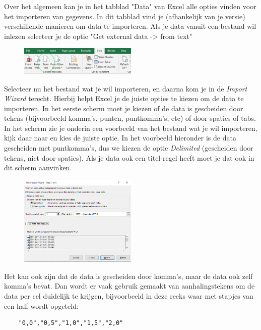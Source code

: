Over het algemeen kan je in het tabblad "Data" van Excel alle opties vinden voor het importeren van gegevens. In dit tabblad vind je (afhankelijk van je versie) verschillende manieren om data te importeren. Als je data vanuit een bestand wil inlezen selecteer je de optie "Get external data -> from text"

\begin{figure}[h]
\begin{center}
\includegraphics[width=0.5\textwidth]{img/Excelimport.png}
\end{center}
\end{figure}

Selecteer nu het bestand wat je wil importeren, en daarna kom je in de \textit{Import Wizard} terecht. Hierbij helpt Excel je de juiste opties te kiezen om de data te importeren. In het eerste scherm moet je kiezen of de data is gescheiden door tekens (bijvoorbeeld komma's, punten, puntkomma's, etc) of door spaties of tabs. In het scherm zie je onderin een voorbeeld van het bestand wat je wil importeren, kijk daar naar en kies de juiste optie. In het voorbeeld hieronder is de data gescheiden met puntkomma's, dus we kiezen de optie \textit{Delimited} (gescheiden door tekens, niet door spaties). Als je data ook een titel-regel heeft moet je dat ook in dit scherm aanvinken. 


\begin{figure}[h]
\begin{center}
\includegraphics[width=0.5\textwidth]{img/Excelimport2.png}
\end{center}
\end{figure}

Het kan ook zijn dat de data is gescheiden door komma's, maar de data ook zelf komma's bevat. Dan wordt er vaak gebruik gemaakt van aanhalingstekens om de data per cel duidelijk te krijgen, bijvoorbeeld in deze reeks waar met stapjes van een half wordt opgeteld:
\begin{verbatim}
    "0,0","0,5","1,0","1,5","2,0"
\end{verbatim}

